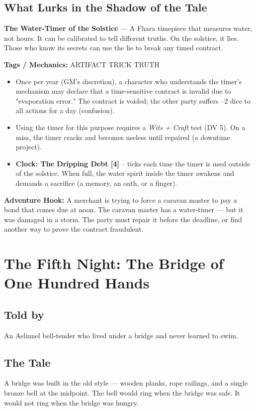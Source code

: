\documentclass[10pt,twoside]{book}
\newcommand{\tag}[1]{\textsc{#1}}
\begin{document}
\section*{What Lurks in the Shadow of the Tale}
\begin{infobox}
\textbf{The Water-Timer of the Solstice} --- A Fhara timepiece that measures water, not hours. It can be calibrated to tell different truths. On the solstice, it lies. Those who know its secrets can use the lie to break any timed contract.

\textbf{Tags / Mechanics:} \tag{ARTIFACT} \tag{TRICK} \tag{TRUTH}

\begin{itemize}
\item Once per year (GM's discretion), a character who understands the timer's mechanism may declare that a time-sensitive contract is invalid due to "evaporation error." The contract is voided; the other party suffers --2 dice to all actions for a day (confusion).
\item Using the timer for this purpose requires a \textit{Wits + Craft} test (DV 5). On a miss, the timer cracks and becomes useless until repaired (a downtime project).
\item \textbf{Clock: The Dripping Debt [4]} -- ticks each time the timer is used outside of the solstice. When full, the water spirit inside the timer awakens and demands a sacrifice (a memory, an oath, or a finger).
\end{itemize}

\textbf{Adventure Hook:} A merchant is trying to force a caravan master to pay a bond that comes due at noon. The caravan master has a water-timer --- but it was damaged in a storm. The party must repair it before the deadline, or find another way to prove the contract fraudulent.
\end{infobox}

\chapter{The Fifth Night: The Bridge of One Hundred Hands}

\section*{Told by}
An Aelinnel bell-tender who lived under a bridge and never learned to swim.

\section*{The Tale}
A bridge was built in the old style --- wooden planks, rope railings, and a single bronze bell at the midpoint. The bell would ring when the bridge was safe. It would not ring when the bridge was hungry.
\end{document}
